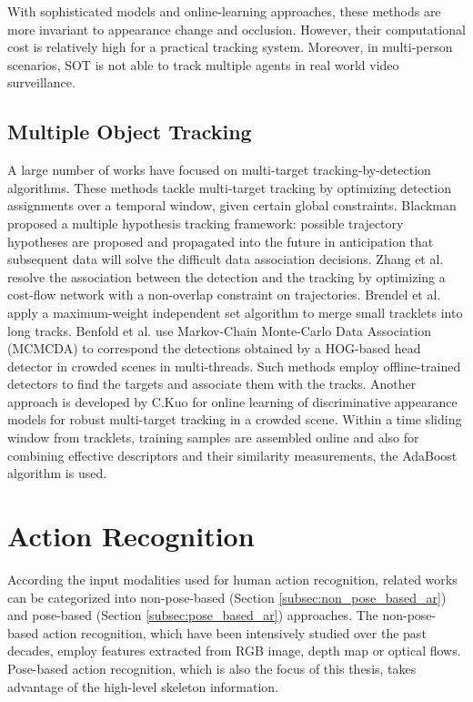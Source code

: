 With sophisticated models and online-learning approaches, these methods are more invariant to appearance change and occlusion. However, their computational cost is relatively high for a practical tracking system. Moreover, in multi-person scenarios, SOT is not able to track multiple agents in real world video surveillance. 

\subsection{Multiple Object Tracking}
A large number of works have focused on multi-target tracking-by-detection algorithms. These methods tackle multi-target tracking by optimizing detection assignments over a temporal window, given certain global constraints. Blackman \cite{blackman2004} proposed a multiple hypothesis tracking framework: possible trajectory hypotheses are proposed and propagated into the future in anticipation that subsequent data will solve the difficult data association decisions. Zhang et al. \cite{zhang2008} resolve the association between the detection and the tracking by optimizing a cost-flow network with a non-overlap constraint on trajectories. Brendel et al. \cite{brendel2011} apply a maximum-weight independent set algorithm to merge small tracklets into long tracks. Benfold et al. \cite{benfold2011} use Markov-Chain Monte-Carlo Data Association (MCMCDA) to correspond the detections obtained by a HOG-based head detector in crowded scenes in multi-threads. Such methods employ offline-trained detectors to find the targets and associate them with the tracks. Another approach is developed by C.Kuo \cite{Kuo2010} for online learning of discriminative appearance models for robust multi-target tracking in a crowded scene. Within a time sliding window from tracklets, training samples are assembled online and also for combining effective descriptors and their similarity measurements, the AdaBoost algorithm is used.


\section{Action Recognition}
According the input modalities used for human action recognition, related works can be categorized into non-pose-based (Section \ref{subsec:non_pose_based_ar}) and pose-based (Section \ref{subsec:pose_based_ar}) approaches. The non-pose-based action recognition, which have been intensively studied over the past decades, employ features extracted from RGB image, depth map or optical flows. Pose-based action recognition, which is also the focus of this thesis, takes advantage of the high-level skeleton information.

